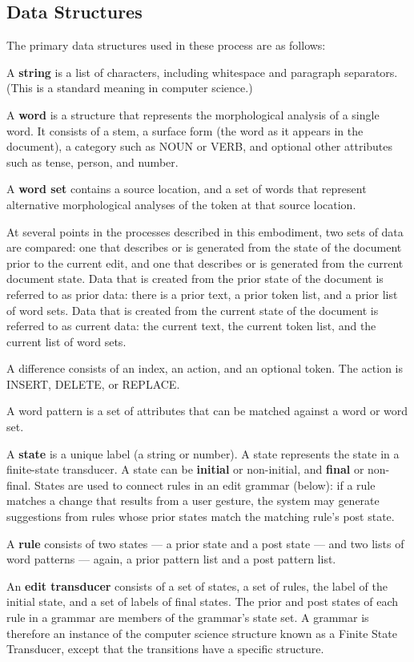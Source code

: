 \documentclass{article}
\newcommand{\dfn}[1]{\textbf{#1}}
\begin{document}
\subsection{Data Structures}

The primary data structures used in these process are as follows:

A \dfn{string} is a list of characters, including whitespace and paragraph separators.  (This is a standard meaning in computer science.)

A \dfn{word} is a structure that represents the morphological analysis of a single word.  It consists of a stem, a surface form (the word as it appears in the document), a category such as NOUN or VERB, and optional other attributes such as tense, person, and number.

A \dfn{word set} contains a source location, and a set of words that represent alternative morphological analyses of the token at that source location.

At several points in the processes described in this embodiment, two sets of data are compared: one that describes or is generated from the state of the document prior to the current edit, and one that describes or is generated from the current document state.  Data that is created from the prior state of the document is referred to as prior data: there is a prior text, a prior token list, and a prior list of word sets.  Data that is created from the current state of the document is referred to as current data: the current text, the current token list, and the current list of word sets.

A difference consists of an index, an action, and an optional token.  The action is INSERT, DELETE, or REPLACE.

A word pattern is a set of attributes that can be matched against a word or word set.

A \dfn{state} is a unique label (a string or number).  A state represents the state in a finite-state transducer.  A state can be \dfn{initial} or non-initial, and \dfn{final} or non-final.  States are used to connect rules in an edit grammar (below): if a rule matches a change that results from a user gesture, the system may generate suggestions from rules whose prior states match the matching rule's post state.

A \dfn{rule} consists of two states --- a prior state and a post state --- and two lists of word patterns --- again, a prior pattern list and a post pattern list.

An \dfn{edit transducer} consists of a set of states, a set of rules, the label of the initial state, and a set of labels of final states.  The prior and post states of each rule in a grammar are members of the grammar's state set.  A grammar is therefore an instance of the computer science structure known as a Finite State Transducer, except that the transitions have a specific structure.
\end{document}
